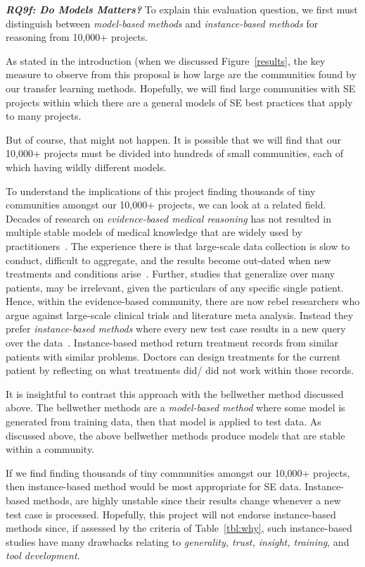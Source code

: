 \textit{\textbf{ RQ9f: Do Models Matters?}} To explain this evaluation question,
we  first must distinguish between {\em model-based methods}
and {\em instance-based methods} for reasoning from 10,000+ projects.

As stated in the introduction (when we discussed Figure~\ref{results},
 the key measure to observe from this proposal is  how large are the communities found by our transfer
 learning methods. 
Hopefully, we will find large communities with SE projects within which there are a general
 models of SE best practices that apply to many projects.

 But of course,    that might not happen. It is possible that we will find that our 10,000+ projects
 must be divided into hundreds of small communities, each of which having wildly different models. 
 
 To understand the implications of this project finding thousands of tiny communities amongst our 10,000+ projects,
    we  can look at a related field.
Decades of research on {\em evidence-based medical reasoning}  has not resulted in multiple
stable models of medical knowledge that are widely used by practitioners~\cite{gallego2013role,gallego2015bringing}.  The experience there
is that large-scale data collection is slow to conduct,
difficult to aggregate, and the   results become out-dated  when  new treatments and conditions arise~\cite{gallego2013role}. 
Further, studies that   generalize over many patients,
may be irrelevant, given   the particulars of any specific single patient. 
Hence,   within the evidence-based community,
there are now rebel researchers who argue against large-scale clinical
trials and literature meta analysis. Instead they prefer
{\em instance-based methods} where every new test case results in a new query over the data~\cite{gallego2015bringing}.
Instance-based method return treatment records from  similar patients with similar problems.
Doctors can design treatments for the current patient by reflecting on what treatments
did/ did not work within those records.

It is insightful to contrast this approach with the bellwether method discussed above.
The bellwether methods   are a {\em model-based method} where some model
is generated from training data, then that model is applied to test data.
As discussed above, the above bellwether methods produce models that are stable within a community.

If we find finding thousands of tiny communities amongst our 10,000+ projects,
then instance-based method would be most appropriate for SE data.
 Instance-based methods, are highly  unstable since their results change whenever a new test case is processed. 
Hopefully, this project will not endorse instance-based methods since, 
if assessed by the criteria of  Table~\ref{tbl:why}, such instance-based  studies have many drawbacks 
relating to {\em generality, trust, insight, training}, and {\em tool development}. 




